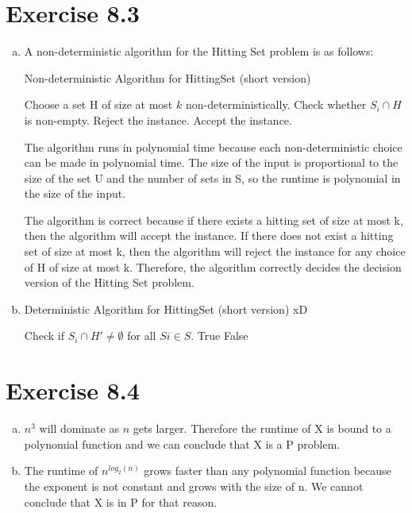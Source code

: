 \documentclass{article} %
\newcommand{\homeworkNumber}{8}
\begin{document}
\section*{Exercise \homeworkNumber.3}
\begin{enumerate}[(a)]
\item
A non-deterministic algorithm for the Hitting Set problem is as follows:

\begin{algorithm}
\caption{Non-deterministic Algorithm for HittingSet (short version)}
\begin{algorithmic}[1]
\STATE Choose a set H of size at most $k$ non-deterministically.
	\STATE Check whether $S_i \cap H$ is non-empty.
		\STATE Reject the instance.
	\ENDIF
\ENDFOR
\STATE Accept the instance.
\end{algorithmic}
\end{algorithm}

The algorithm runs in polynomial time because each non-deterministic choice can be made in polynomial time. The size of the input is proportional to the size of the set U and the number of sets in S, so the runtime is polynomial in the size of the input.

The algorithm is correct because if there exists a hitting set of size at most k, then the algorithm will accept the instance. If there does not exist a hitting set of size at most k, then the algorithm will reject the instance for any choice of H of size at most k. Therefore, the algorithm correctly decides the decision version of the Hitting Set problem.

\item
\begin{algorithm}
\caption{Deterministic Algorithm for HittingSet (short version) xD}
\begin{algorithmic}[1]
    \STATE Check if $S_i \cap H' \neq \emptyset$ for all $Si \in S$.
    \RETURN True
\ENDFOR
\RETURN False
\end{algorithmic}
\end{algorithm}

\end{enumerate}

\section*{Exercise \homeworkNumber.4}
\begin{enumerate}[(a)]
\item $n^3$ will dominate as $n$ gets larger. Therefore the runtime of X is bound to a polynomial function and we can conclude that X is a P problem.
\item The runtime of $n^{log_2(n)}$ grows faster than any polynomial function because the exponent is not constant and grows with the size of n. We cannot conclude that X is in P for that reason.
\end{enumerate}
\end{document}
